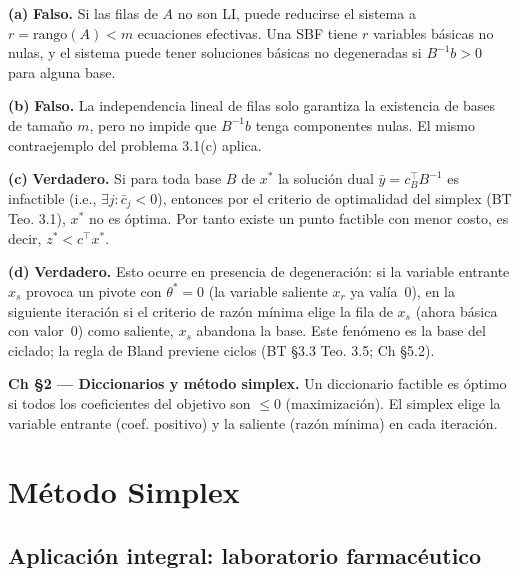 \documentclass[12pt]{article}
\theoremstyle{plain}
\begin{document}
\begin{solucion}

\noindent\textbf{(a)} \textbf{Falso.} Si las filas de $A$ no son LI, puede reducirse el sistema a $r = \text{rango}(A) < m$ ecuaciones efectivas. Una SBF tiene $r$ variables básicas no nulas, y el sistema puede tener soluciones básicas no degeneradas si $B^{-1}b > 0$ para alguna base.

\noindent\textbf{(b)} \textbf{Falso.} La independencia lineal de filas solo garantiza la existencia de bases de tamaño $m$, pero no impide que $B^{-1}b$ tenga componentes nulas. El mismo contraejemplo del problema 3.1(c) aplica.

\noindent\textbf{(c)} \textbf{Verdadero.} Si para toda base $B$ de $x^*$ la solución dual $\bar{y} = c_B^\top B^{-1}$ es infactible (i.e., $\exists j: \bar{c}_j < 0$), entonces por el criterio de optimalidad del simplex (BT Teo. 3.1), $x^*$ no es óptima. Por tanto existe un punto factible con menor costo, es decir, $z^* < c^\top x^*$.

\noindent\textbf{(d)} \textbf{Verdadero.} Esto ocurre en presencia de degeneración: si la variable entrante $x_s$ provoca un pivote con $\theta^* = 0$ (la variable saliente $x_r$ ya valía~0), en la siguiente iteración si el criterio de razón mínima elige la fila de $x_s$ (ahora básica con valor~0) como saliente, $x_s$ abandona la base. Este fenómeno es la base del ciclado; la regla de Bland previene ciclos (BT §3.3 Teo. 3.5; Ch §5.2).

\end{solucion}

\begin{teofund}
\textbf{Ch §2 — Diccionarios y método simplex.} Un diccionario factible es óptimo si todos los coeficientes del objetivo son $\leq 0$ (maximización). El simplex elige la variable entrante (coef. positivo) y la saliente (razón mínima) en cada iteración.
\end{teofund}

\bigskip

\section{Método Simplex}

\subsection{Aplicación integral: laboratorio farmacéutico}
\end{document}
